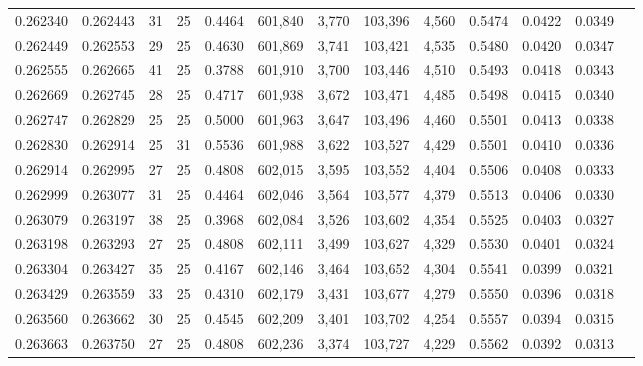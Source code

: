 \begin{tabular}{rrrrrrrrrrrrr}
0.262340 & 0.262443 &    31 &  25 &                                     0.4464 & 601,840 &   3,770 & 103,396 &   4,560 & 0.5474 & 0.0422 & 0.0349 \\
0.262449 & 0.262553 &    29 &  25 &                                     0.4630 & 601,869 &   3,741 & 103,421 &   4,535 & 0.5480 & 0.0420 & 0.0347 \\
0.262555 & 0.262665 &    41 &  25 &                                     0.3788 & 601,910 &   3,700 & 103,446 &   4,510 & 0.5493 & 0.0418 & 0.0343 \\
0.262669 & 0.262745 &    28 &  25 &                                     0.4717 & 601,938 &   3,672 & 103,471 &   4,485 & 0.5498 & 0.0415 & 0.0340 \\
0.262747 & 0.262829 &    25 &  25 &                                     0.5000 & 601,963 &   3,647 & 103,496 &   4,460 & 0.5501 & 0.0413 & 0.0338 \\
0.262830 & 0.262914 &    25 &  31 &                                     0.5536 & 601,988 &   3,622 & 103,527 &   4,429 & 0.5501 & 0.0410 & 0.0336 \\
0.262914 & 0.262995 &    27 &  25 &                                     0.4808 & 602,015 &   3,595 & 103,552 &   4,404 & 0.5506 & 0.0408 & 0.0333 \\
0.262999 & 0.263077 &    31 &  25 &                                     0.4464 & 602,046 &   3,564 & 103,577 &   4,379 & 0.5513 & 0.0406 & 0.0330 \\
0.263079 & 0.263197 &    38 &  25 &                                     0.3968 & 602,084 &   3,526 & 103,602 &   4,354 & 0.5525 & 0.0403 & 0.0327 \\
0.263198 & 0.263293 &    27 &  25 &                                     0.4808 & 602,111 &   3,499 & 103,627 &   4,329 & 0.5530 & 0.0401 & 0.0324 \\
0.263304 & 0.263427 &    35 &  25 &                                     0.4167 & 602,146 &   3,464 & 103,652 &   4,304 & 0.5541 & 0.0399 & 0.0321 \\
0.263429 & 0.263559 &    33 &  25 &                                     0.4310 & 602,179 &   3,431 & 103,677 &   4,279 & 0.5550 & 0.0396 & 0.0318 \\
0.263560 & 0.263662 &    30 &  25 &                                     0.4545 & 602,209 &   3,401 & 103,702 &   4,254 & 0.5557 & 0.0394 & 0.0315 \\
0.263663 & 0.263750 &    27 &  25 &                                     0.4808 & 602,236 &   3,374 & 103,727 &   4,229 & 0.5562 & 0.0392 & 0.0313 \\

\end{tabular}
